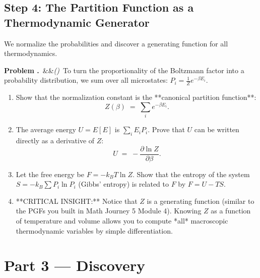 \documentclass[12pt, a4paper, twoside]{book}
\newcounter{problem}[chapter]
\newcommand{\problem}[1][]{\refstepcounter{problem}\medskip\noindent
  \textcolor{accent}{\textbf{Problem \theproblem.}}\ \ifx&#1&\else\textit{(#1)}\ \fi}
\begin{document}
\subsection{Step 4: The Partition Function as a Thermodynamic Generator}

We normalize the probabilities and discover a generating function for all thermodynamics.

\begin{explobox}
\problem To turn the proportionality of the Boltzmann factor into a probability distribution, we sum over all microstates: $P_i = \frac{1}{Z} e^{-\beta E_i}$.
\begin{enumerate}[label=(\alph*), topsep=2pt]
  \item Show that the normalization constant is the **canonical partition function**:
  \[
    Z(\beta) \;=\; \sum_{i} e^{-\beta E_i}.
  \]
  \item The average energy $U = E[E]$ is $\sum_i E_i P_i$. Prove that $U$ can be written directly as a derivative of $Z$:
  \[
    U \;=\; -\frac{\partial \ln Z}{\partial \beta}.
  \]
  \item Let the free energy be $F = -k_B T \ln Z$. Show that the entropy of the system $S = -k_B \sum P_i \ln P_i$ (Gibbs' entropy) is related to $F$ by $F = U - TS$.
  \item **CRITICAL INSIGHT:** Notice that $Z$ is a generating function (similar to the PGFs you built in Math Journey 5 Module 4). Knowing $Z$ as a function of temperature and volume allows you to compute *all* macroscopic thermodynamic variables by simple differentiation.
\end{enumerate}
\end{explobox}

\newpage

\section{Part 3 --- Discovery}
\end{document}
